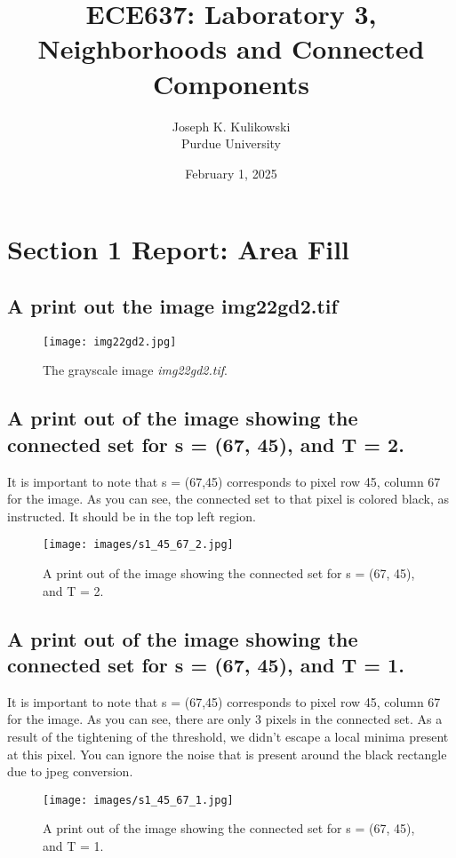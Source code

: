 \documentclass{article}
\title{ECE637: Laboratory 3, Neighborhoods and Connected Components}
\author{Joseph K. Kulikowski \\
Purdue University}
\date{February 1, 2025}
\begin{document}
\maketitle
\tableofcontents
\listoffigures
\lstlistoflistings
\listoftables
\newpage
\section{Section 1 Report: Area Fill}
\subsection{A print out the image img22gd2.tif}
\begin{figure}[h]
    \centering
    \texttt{[image: img22gd2.jpg]}
    \caption{The grayscale image \textit{img22gd2.tif}.}
    \label{fig:1}
\end{figure}

\newpage
\subsection{A print out of the image showing the connected set for s = (67, 45), and T = 2.}
It is important to note that s = (67,45) corresponds to pixel row 45, column 67 for the image. As you can see, the connected set to that pixel is colored black, as instructed. It should be in the top left region.
\begin{figure}[h]
    \centering
    \texttt{[image: images/s1\_45\_67\_2.jpg]}
    \caption{A print out of the image showing the connected set for s = (67, 45), and T = 2.}
    \label{fig:2}
\end{figure}
\newpage
\subsection{A print out of the image showing the connected set for s = (67, 45), and T = 1.}
It is important to note that s = (67,45) corresponds to pixel row 45, column 67 for the image. As you can see, there are only 3 pixels in the connected set. As a result of the tightening of the threshold, we didn't escape a local minima present at this pixel. You can ignore the noise that is present around the black rectangle due to jpeg conversion.
\begin{figure}[h]
    \centering
    \texttt{[image: images/s1\_45\_67\_1.jpg]}
    \caption{A print out of the image showing the connected set for s = (67, 45), and T = 1.}
    \label{fig:3}
\end{figure}
\newpage
\end{document}
